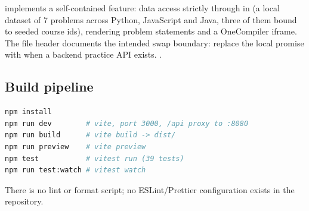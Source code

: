  implements a self-contained feature: data access strictly through  in  (a local dataset of 7 problems across Python, JavaScript and Java, three of them bound to seeded course ids), rendering problem statements and a OneCompiler iframe. The file header documents the intended swap boundary: replace the local promise with  when a backend practice API exists. .

\subsection{Build pipeline}

\begin{lstlisting}[language=bash,caption={Verified frontend commands (frontend/package.json)}]
npm install
npm run dev        # vite, port 3000, /api proxy to :8080
npm run build      # vite build -> dist/
npm run preview    # vite preview
npm test           # vitest run (39 tests)
npm run test:watch # vitest watch
\end{lstlisting}

\noindent There is no lint or format script; no ESLint/Prettier configuration exists in the repository. 
